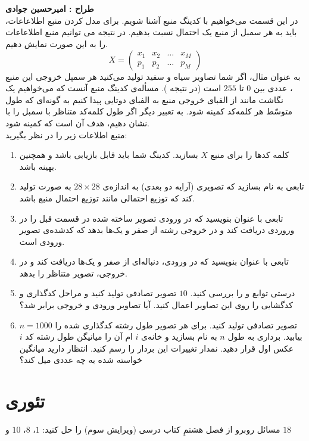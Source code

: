 \documentclass[a4paper]{article}
\begin{document}
\section{}
\textbf{طراح :‌ امیرحسین جوادی}
\vspace{0.5cm}
\\
در این قسمت می‌خواهیم با کدینگ منبع
 آشنا شویم. برای مدل کردن منبع اطلاعاعات، باید به هر سمبل از منبع یک احتمال نسبت بدهیم. در نتیجه می توانیم منبع اطلاعاعات را به این صورت نمایش دهیم.
 \[X = \begin{pmatrix}
 	x_1 & x_2 & \dots & x_M\\
 	p_1 & p_2 & \dots & p_M
 \end{pmatrix}\]
 به عنوان مثال، اگر شما تصاویر سیاه و سفید تولید می‌کنید هر سمپل خروجی این منبع ، عددی بین $ 0 $ تا $ 255 $ است (در نتیجه 
 ).
 مسأله‌ی کدینگ منبع آنست که می‌خواهیم یک نگاشت مانند
 از الفبای خروجی منبع به الفبای دوتایی
 پیدا کنیم به گونه‌ای که طول متوسّط هر کلمه‌کد کمینه شود. به تعبیر دیگر اگر طول کلمه‌کد متناظر با سمبل
 را با
 نشان دهیم، هدف آن است که
 کمینه شود. 
 \\
 منبع اطلاعات زیر را در نظر بگیرید:
\lr{\[X = \begin{pmatrix}
		I_{x}=0 & I_{x}=50 & I_{x}=100 & I_{x}=150 & I_{x}=200 & I_{x}=250 & \text{otherwise}\\
		\frac{1}{2} & \frac{1}{32} & \frac{1}{8} & \frac{1}{16}& \frac{1}{32}& \frac{1}{4} & 0
	\end{pmatrix}\]}
\begin{enumerate}
	\item 
 کلمه کدها را برای منبع  $ X $ بسازید. کدینگ شما باید قابل بازیابی باشد و همچنین بهینه باشد. 
 	\item 
 	تابعی به نام 
 	بسازید که تصویری (آرایه دو بعدی) به اندازه‌ی
 	 $ 28 \times 28 $
 	 به صورت 
 	 تولید کند که توزیع احتمالی مانند توزیع احتمال منبع
 	 باشد.
 	 \item
 	 تابعی با عنوان
 	 بنویسید که در ورودی تصویر ساخته شده در قسمت قبل را در وروردی دریافت کند و در خروجی رشته از صفر و یک‌ها بدهد که کدشده‌ی تصویر ورودی است.
 	 \item 
 	 تابعی با عنوان
 	 بنویسید که در ورودی، دنباله‌ای از صفر و یک‌ها دریافت کند و در خروجی، تصویر متناظر را بدهد.   
 	 \item 
 	 درستی توابع
 	 و 
 	 را بررسی کنید. $ 10 $ تصویر تصادفی تولید کنید و مراحل کدگذاری و کدگشایی را روی این تصاویر اعمال کنید. آیا تصاویر ورودی و خروجی برابر شد؟ 
 	 \item 
 	 $ n = 1000 $ 
 	 تصویر تصادفی تولید کنید. برای هر تصویر طول رشته کدگذاری شده را بیابید. بردار‌ی به طول $ n $ به نام 
بسازید و خانه‌ی‌ $ i $ ام آن را میانیگن طول رشته کد $ i $ عکس اول قرار دهید. نمدار تغییرات این بردار را رسم کنید. انتظار دارید میانگین خواسته شده به چه عددی میل کند؟ 
\end{enumerate}
\section{تئوری}
	مسائل روبرو از فصل هشتمِ کتاب درسی (ویرایش سوم) را حل کنید:
	 $ 1 $، $ 8 $، $ 10 $ و $ 18 $
\end{document}
